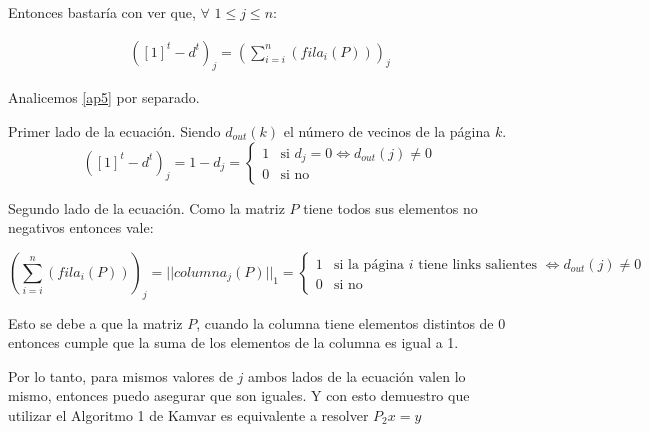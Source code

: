 Entonces bastar\'ia con ver que, $\forall$ $ 1 \leq j \leq n$:

\begin{align}
	([1]^{t} -d^{t})_{j} = \left(\sum_{i=i}^{n}(fila_{i}(P))\right)_{j} \label{ap5}
\end{align}

Analicemos \eqref{ap5} por separado.

Primer lado de la ecuaci\'on. Siendo $d_{out}(k)$ el n\'umero de vecinos de la p\'agina $k$.
\[
	([1]^{t} -d^{t})_{j} = 
	1 - d_{j} = 
	\begin{cases}
		1 & \text{si }d_{j} = 0 \iff d_{out}(j) \neq 0 \\
		0 & \text{si no}
	\end{cases}
\]

Segundo lado de la ecuaci\'on. Como la matriz $P$ tiene todos sus elementos no negativos entonces vale:

\[
	\left(\sum_{i=i}^{n}(fila_{i}(P))\right)_{j} = ||columna_{j}(P)||_{1} =
		\begin{cases}
		1 & \text{si la p\'agina $i$ tiene links salientes } \iff d_{out}(j) \neq 0 \\
		0 & \text{si no}
	\end{cases}
\]

Esto se debe a que la matriz $P$, cuando la columna tiene elementos distintos de 0 entonces cumple que la suma de los elementos de la columna es igual a 1.

Por lo tanto, para mismos valores de $j$ ambos lados de la ecuaci\'on valen lo mismo, entonces puedo asegurar que son iguales. Y con esto demuestro que utilizar el Algoritmo 1 de Kamvar\cite{Kamvar2003} es equivalente a resolver $P_{2}x = y$